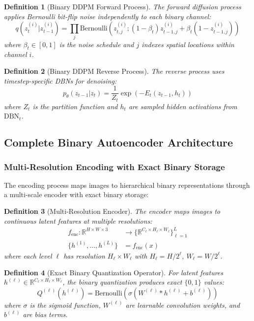 \documentclass{article}
\newtheorem{definition}{Definition}
\begin{document}
\begin{definition}[Binary DDPM Forward Process]
The forward diffusion process applies Bernoulli bit-flip noise independently to each binary channel:
\begin{equation}
q(z_t^{(i)} | z_{t-1}^{(i)}) = \prod_{j} \text{Bernoulli}\left(z_{t,j}^{(i)}; (1-\beta_t) z_{t-1,j}^{(i)} + \beta_t (1-z_{t-1,j}^{(i)})\right)
\end{equation}
where $\beta_t \in [0,1]$ is the noise schedule and $j$ indexes spatial locations within channel $i$.
\end{definition}

\begin{definition}[Binary DDPM Reverse Process]
The reverse process uses timestep-specific DBNs for denoising:
\begin{equation}
p_\theta(z_{t-1} | z_t) = \frac{1}{Z_t} \exp(-E_t(z_{t-1}, h_t))
\end{equation}
where $Z_t$ is the partition function and $h_t$ are sampled hidden activations from $\text{DBN}_t$.
\end{definition}

\subsection{Complete Binary Autoencoder Architecture}

\subsubsection{Multi-Resolution Encoding with Exact Binary Storage}

The encoding process maps images to hierarchical binary representations through a multi-scale encoder with exact binary storage:

\begin{definition}[Multi-Resolution Encoder]
The encoder maps images to continuous latent features at multiple resolutions:
\begin{align}
f_{\text{enc}}: \mathbb{R}^{H \times W \times 3} &\rightarrow \{\mathbb{R}^{C_\ell \times H_\ell \times W_\ell}\}_{\ell=1}^L\\
\{h^{(1)}, \ldots, h^{(L)}\} &= f_{\text{enc}}(x)
\end{align}
where each level $\ell$ has resolution $H_\ell \times W_\ell$ with $H_\ell = H/2^\ell$, $W_\ell = W/2^\ell$.
\end{definition}

\begin{definition}[Exact Binary Quantization Operator]
For latent features $h^{(\ell)} \in \mathbb{R}^{C_\ell \times H_\ell \times W_\ell}$, the binary quantization produces exact $\{0,1\}$ values:
\begin{equation}
Q^{(\ell)}(h^{(\ell)}) = \text{Bernoulli}(\sigma(W^{(\ell)} \ast h^{(\ell)} + b^{(\ell)}))
\end{equation}
where $\sigma$ is the sigmoid function, $W^{(\ell)}$ are learnable convolution weights, and $b^{(\ell)}$ are bias terms.
\end{definition}
\end{document}
